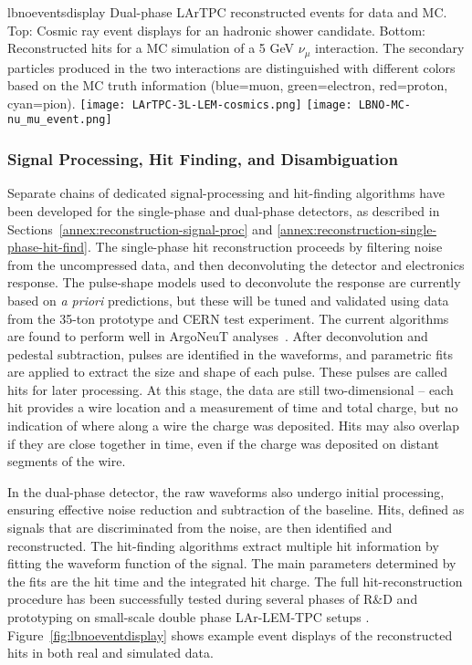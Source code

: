 \begin{cdrfigure}{lbnoeventsdisplay}
{
Dual-phase LArTPC reconstructed events for data and MC.
Top: Cosmic ray event displays for an hadronic shower candidate.
Bottom: Reconstructed hits for a MC simulation of a 5 GeV $\nu_{\mu}$ interaction.
The secondary particles produced in the two interactions are distinguished with different colors based on the MC truth information (blue=muon, green=electron, red=proton, cyan=pion).
}
\texttt{[image: LArTPC-3L-LEM-cosmics.png]}
\texttt{[image: LBNO-MC-nu\_mu\_event.png]}
\end{cdrfigure}

\subsubsection{Signal Processing, Hit Finding, and Disambiguation}

Separate chains of dedicated signal-processing and hit-finding 
algorithms have been developed for the single-phase and dual-phase detectors,
as described in Sections~\ref{annex:reconstruction-signal-proc} and \ref{annex:reconstruction-single-phase-hit-find}.
The single-phase hit reconstruction proceeds by filtering noise
from the uncompressed data, and then deconvoluting the 
detector and electronics response.
The pulse-shape models used to deconvolute the response are currently
based on {\it a priori} predictions, but these will be tuned and
validated using data from the 35-ton prototype and CERN test experiment.
The current algorithms are found to perform well in ArgoNeuT analyses~\cite{Anderson:2012vc}.
After deconvolution and pedestal subtraction, pulses are identified in
the waveforms, and parametric fits are applied to extract the size and
shape of each pulse. These pulses are called hits for later processing.
At this stage, the data are still two-dimensional -- each hit provides
a wire location and a measurement of time and total charge,
but no indication of where along a wire the charge was deposited.
Hits may also overlap if they are close together in time, 
even if the charge was deposited on distant segments of the wire.

In the dual-phase detector, the raw waveforms also undergo initial processing, 
ensuring effective noise reduction and subtraction of the baseline.
Hits, defined as signals that are discriminated from the noise, are then identified and reconstructed.
The hit-finding algorithms extract multiple hit information by fitting the waveform function of the signal.
The main parameters determined by the fits are the hit time and the integrated hit charge.
The full hit-reconstruction procedure has been successfully tested during several phases 
of R$\&$D and prototyping on small-scale double phase LAr-LEM-TPC setups \cite{Badertscher:2008rf,Badertscher:2012dq}.
Figure~\ref{fig:lbnoeventdisplay} shows example event displays of the reconstructed hits 
in both real and simulated data. 

